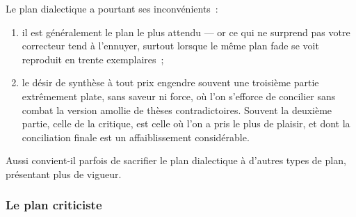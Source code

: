 \documentclass[a4paper,11pt]{article}
\begin{document}
\par

Le plan dialectique a pourtant ses inconvénients~:
\begin{enumerate}
\item il est généralement le plan le plus attendu --- or ce qui ne
  surprend pas votre correcteur tend à l'ennuyer, surtout lorsque le
  même plan fade se voit reproduit en trente exemplaires~;
\item le désir de synthèse à tout prix engendre souvent une troisième
  partie extrêmement plate, sans saveur ni force, où l'on s'efforce de
  concilier sans combat la version amollie de thèses
  contradictoires. Souvent la deuxième partie, celle de la critique, est
  celle où l'on a pris le plus de plaisir, et dont la conciliation
  finale est un affaiblissement considérable.
\end{enumerate}

Aussi convient-il parfois de sacrifier le plan dialectique à d'autres
types de plan, présentant plus de vigueur.


\subsubsection{Le plan criticiste}
\end{document}
